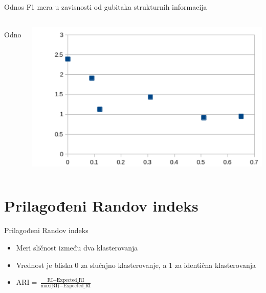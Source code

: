 \documentclass{beamer}
\begin{document}
\begin{frame}{Odnos F1 mera u zavisnosti od gubitaka strukturnih informacija}
    \begin{columns}
        \begin{column}{0.2\textwidth}
            $$ \text{Odnos} = \frac{F_1^p}{F_1^s} $$ 
        \end{column}
        \begin{column}{0.8\textwidth}
            \includegraphics[height=0.6\textheight]{png/grafik.png}
        \end{column}
    \end{columns}
\end{frame}

\section{Prilagođeni Randov indeks}
\begin{frame}{Prilagođeni Randov indeks}
    \begin{itemize}
        \item Meri sličnost između dva klasterovanja
        \item Vrednost je bliska 0 za slučajno klasterovanje, a 1 za identična klasterovanja
        \item $ \text{ARI} = \frac{\text{RI} - \text{Expected\_RI}}{\text{max(RI)} - \text{Expected\_RI}} $
    \end{itemize}
\end{frame}
\end{document}
